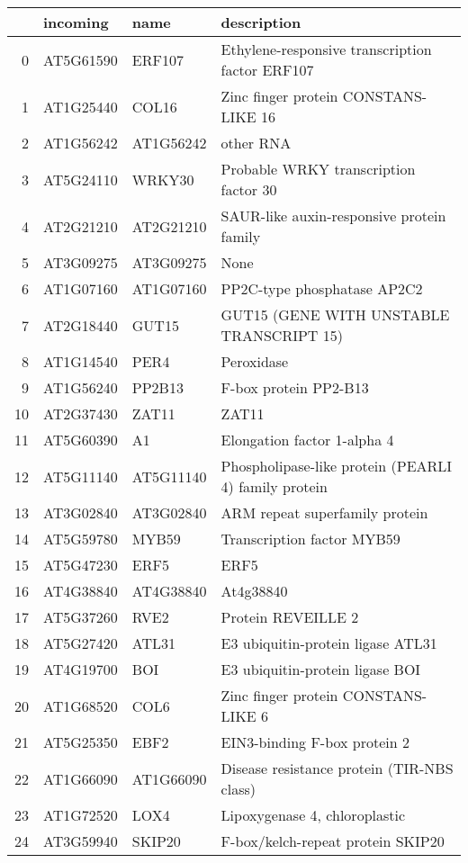 \documentclass[a4paper]{article}
\begin{document}
\begin{center}
\begin{tabular}{rlll}
 & incoming & name & description\\
\hline
0 & AT5G61590 & ERF107 & Ethylene-responsive transcription factor ERF107\\
1 & AT1G25440 & COL16 & Zinc finger protein CONSTANS-LIKE 16\\
2 & AT1G56242 & AT1G56242 & other RNA\\
3 & AT5G24110 & WRKY30 & Probable WRKY transcription factor 30\\
4 & AT2G21210 & AT2G21210 & SAUR-like auxin-responsive protein family\\
5 & AT3G09275 & AT3G09275 & None\\
6 & AT1G07160 & AT1G07160 & PP2C-type phosphatase AP2C2\\
7 & AT2G18440 & GUT15 & GUT15 (GENE WITH UNSTABLE TRANSCRIPT 15)\\
8 & AT1G14540 & PER4 & Peroxidase\\
9 & AT1G56240 & PP2B13 & F-box protein PP2-B13\\
10 & AT2G37430 & ZAT11 & ZAT11\\
11 & AT5G60390 & A1 & Elongation factor 1-alpha 4\\
12 & AT5G11140 & AT5G11140 & Phospholipase-like protein (PEARLI 4) family protein\\
13 & AT3G02840 & AT3G02840 & ARM repeat superfamily protein\\
14 & AT5G59780 & MYB59 & Transcription factor MYB59\\
15 & AT5G47230 & ERF5 & ERF5\\
16 & AT4G38840 & AT4G38840 & At4g38840\\
17 & AT5G37260 & RVE2 & Protein REVEILLE 2\\
18 & AT5G27420 & ATL31 & E3 ubiquitin-protein ligase ATL31\\
19 & AT4G19700 & BOI & E3 ubiquitin-protein ligase BOI\\
20 & AT1G68520 & COL6 & Zinc finger protein CONSTANS-LIKE 6\\
21 & AT5G25350 & EBF2 & EIN3-binding F-box protein 2\\
22 & AT1G66090 & AT1G66090 & Disease resistance protein (TIR-NBS class)\\
23 & AT1G72520 & LOX4 & Lipoxygenase 4, chloroplastic\\
24 & AT3G59940 & SKIP20 & F-box/kelch-repeat protein SKIP20\\
\end{tabular}
\end{center}
\end{document}

